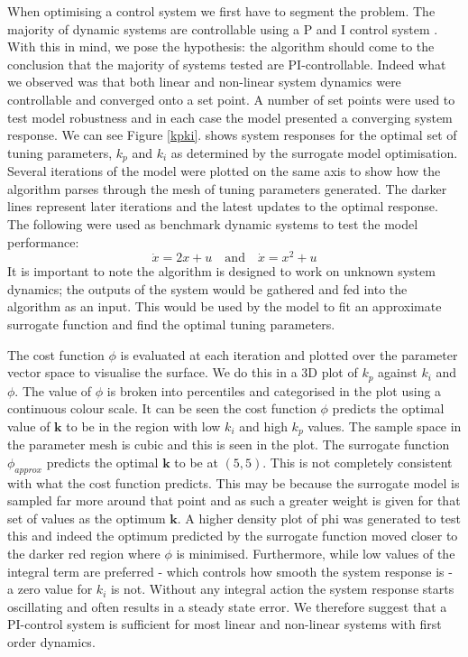 \documentclass[conference]{IEEEtran}
\theoremstyle{definition}
\begin{document}
\noindent When optimising a control system we first have to segment the problem. The majority of dynamic systems are controllable using a P and I control system \cite{PIvPID}. With this in mind, we pose the hypothesis: the algorithm should come to the conclusion that the majority of systems tested are PI-controllable. Indeed what we observed was that both linear and non-linear system dynamics were controllable and converged onto a set point. A number of set points were used to test model robustness and in each case the model presented a converging system response. We can see Figure \ref{kpki}. shows system responses for the optimal set of tuning parameters, $k_p$ and $k_i$  as determined by the surrogate model optimisation. Several iterations of the model were plotted on the same axis to show how the algorithm parses through the mesh of tuning parameters generated. The darker lines represent later iterations and the latest updates to the optimal response. The following were used as benchmark dynamic systems to test the model performance:
\begin{equation}
\dot{x} = 2x +u \quad \textrm{and} \quad \dot{x} = x^2 + u
\end{equation}
It is important to note the algorithm is designed to work on unknown system dynamics; the outputs of the system would be gathered and fed into the algorithm as an input. This would be used by the model to fit an approximate surrogate function and find the optimal tuning parameters.

The cost function $\phi$ is evaluated at each iteration and plotted over the parameter vector space to visualise the surface. We do this in a 3D plot of $k_p$ against $k_i$ and $\phi$. The value of $\phi$ is broken into percentiles and categorised in the plot using a continuous colour scale. It can be seen the cost function $\phi$ predicts the optimal value of $\mathbf{k}$ to be in the region with low $k_i$ and high $k_p$ values. The sample space in the parameter mesh is cubic and this is seen in the plot. The surrogate function $\phi_{approx}$ predicts the optimal $\mathbf{k}$ to be at $(5,5)$. This is not completely consistent with what the cost function predicts. This may be because the surrogate model is sampled far more around that point and as such a greater weight is given for that set of values as the optimum $\mathbf{k}$. A higher density plot of phi was generated to test this and indeed the optimum predicted by the surrogate function moved closer to the darker red region where $\phi$ is minimised. Furthermore, while low values of the integral term are preferred - which controls how smooth the system response is - a zero value for $k_i$ is not. Without any integral action the system response starts oscillating and often results in a steady state error. We therefore suggest that a PI-control system is sufficient for most linear and non-linear systems with first order dynamics. 
\end{document}
